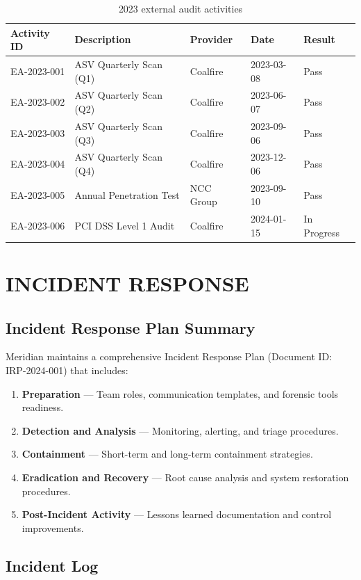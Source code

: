 \documentclass[
    language=english,
    doctype=compliance-document,
    institution=none,
]{../../omnilatex}
\begin{document}
\begin{table}[h]
\centering
\small
\begin{tabular}{p{2.5cm}p{4cm}p{3cm}p{2.5cm}p{2cm}}
\toprule
\textbf{Activity ID} & \textbf{Description} & \textbf{Provider} & \textbf{Date} & \textbf{Result} \\
\midrule
EA-2023-001 & ASV Quarterly Scan (Q1) & Coalfire & 2023-03-08 & Pass \\
EA-2023-002 & ASV Quarterly Scan (Q2) & Coalfire & 2023-06-07 & Pass \\
EA-2023-003 & ASV Quarterly Scan (Q3) & Coalfire & 2023-09-06 & Pass \\
EA-2023-004 & ASV Quarterly Scan (Q4) & Coalfire & 2023-12-06 & Pass \\
EA-2023-005 & Annual Penetration Test & NCC Group & 2023-09-10 & Pass \\
EA-2023-006 & PCI DSS Level 1 Audit & Coalfire & 2024-01-15 & In Progress \\
\bottomrule
\end{tabular}
\caption{2023 external audit activities}
\end{table}

\section{INCIDENT RESPONSE}

\subsection{Incident Response Plan Summary}
Meridian maintains a comprehensive Incident Response Plan (Document ID: IRP-2024-001) that includes:
\begin{enumerate}
    \item \textbf{Preparation} --- Team roles, communication templates, and forensic tools readiness.
    \item \textbf{Detection and Analysis} --- Monitoring, alerting, and triage procedures.
    \item \textbf{Containment} --- Short-term and long-term containment strategies.
    \item \textbf{Eradication and Recovery} --- Root cause analysis and system restoration procedures.
    \item \textbf{Post-Incident Activity} --- Lessons learned documentation and control improvements.
\end{enumerate}

\subsection{Incident Log}
\end{document}
